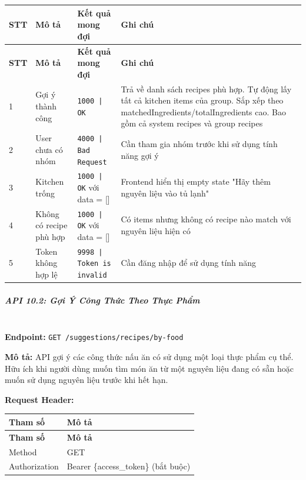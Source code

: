 \begin{longtable}{|p{}|p{}|p{}|p{}|}
\hline
\textbf{STT} & \textbf{Mô tả} & \textbf{Kết quả mong đợi} & \textbf{Ghi chú} \\
\hline
\endfirsthead

\hline
\textbf{STT} & \textbf{Mô tả} & \textbf{Kết quả mong đợi} & \textbf{Ghi chú} \\
\hline
\endhead

\hline
\endfoot

1 & Gợi ý thành công & \texttt{1000 | OK} & Trả về danh sách recipes phù hợp. Tự động lấy tất cả kitchen items của group. Sắp xếp theo matchedIngredients/totalIngredients cao. Bao gồm cả system recipes và group recipes \\
\hline
2 & User chưa có nhóm & \texttt{4000 | Bad Request} & Cần tham gia nhóm trước khi sử dụng tính năng gợi ý \\
\hline
3 & Kitchen trống & \texttt{1000 | OK} với data = [] & Frontend hiển thị empty state "Hãy thêm nguyên liệu vào tủ lạnh" \\
\hline
4 & Không có recipe phù hợp & \texttt{1000 | OK} với data = [] & Có items nhưng không có recipe nào match với nguyên liệu hiện có \\
\hline
5 & Token không hợp lệ & \texttt{9998 | Token is invalid} & Cần đăng nhập để sử dụng tính năng \\
\hline
\end{longtable}

\subparagraph{API 10.2: Gợi Ý Công Thức Theo Thực Phẩm}~\\

\textbf{Endpoint:} \texttt{GET /suggestions/recipes/by-food}

\textbf{Mô tả:} API gợi ý các công thức nấu ăn có sử dụng một loại thực phẩm cụ thể. Hữu ích khi người dùng muốn tìm món ăn từ một nguyên liệu đang có sẵn hoặc muốn sử dụng nguyên liệu trước khi hết hạn.

\textbf{Request Header:}

\begin{longtable}{|p{}|p{}|}
\hline
\textbf{Tham số} & \textbf{Mô tả} \\
\hline
\endfirsthead

\hline
\textbf{Tham số} & \textbf{Mô tả} \\
\hline
\endhead

\hline
\endfoot

Method & GET \\
\hline
Authorization & Bearer \{access\_token\} (bắt buộc) \\
\hline
\end{longtable}

